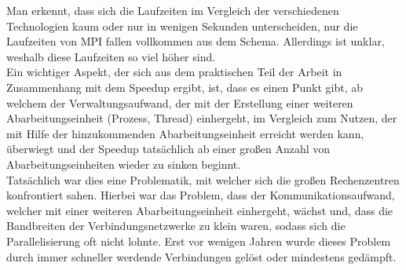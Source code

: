 				Man erkennt, dass sich die Laufzeiten im Vergleich der verschiedenen Technologien kaum oder nur in wenigen Sekunden unterscheiden, nur die Laufzeiten von MPI fallen vollkommen aus dem Schema. Allerdings ist unklar, weshalb diese Laufzeiten so viel höher sind.\\
				Ein wichtiger Aspekt, der sich aus dem praktischen Teil der Arbeit in Zusammenhang mit dem Speedup ergibt, ist, dass es einen Punkt gibt, ab welchem der Verwaltungsaufwand, der mit der Erstellung einer weiteren Abarbeitungseinheit (Prozess, Thread) einhergeht, im Vergleich zum Nutzen, der mit Hilfe der hinzukommenden Abarbeitungseinheit erreicht werden kann, überwiegt und der Speedup tatsächlich ab einer großen Anzahl von Abarbeitungseinheiten wieder zu sinken beginnt.\\
				Tatsächlich war dies eine Problematik, mit welcher sich die großen Rechenzentren konfrontiert sahen. Hierbei war das Problem, dass der Kommunikationsaufwand, welcher mit einer weiteren Abarbeitungseinheit einhergeht, wächst und, dass die Bandbreiten der Verbindungsnetzwerke zu klein waren, sodass sich die Parallelisierung oft nicht lohnte. Erst vor wenigen Jahren wurde dieses Problem durch immer schneller werdende Verbindungen gelöst oder mindestens gedämpft.